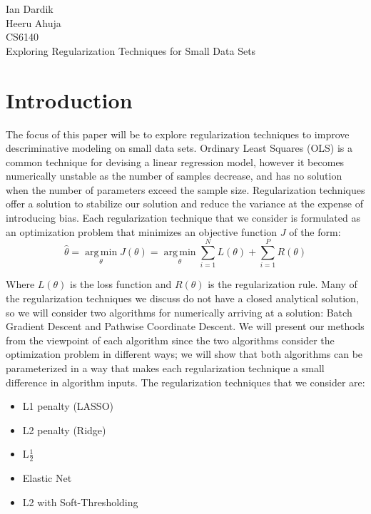 \documentclass[11pt]{article}
\newcommand{\thh}{\hat{\theta}}
\DeclareMathOperator*{\argmin}{arg\,min}
\begin{document}
Ian Dardik \\
Heeru Ahuja \\
CS6140 \\
Exploring Regularization Techniques for Small Data Sets

\section{Introduction}
The focus of this paper will be to explore regularization techniques to improve descriminative modeling on small data sets.  Ordinary Least Squares (OLS) is a common technique for devising a linear regression model, however it becomes numerically unstable as the number of samples decrease, and has no solution when the number of parameters exceed the sample size.  Regularization techniques offer a solution to stabilize our solution and reduce the variance at the expense of introducing bias.  Each regularization technique that we consider is formulated as an optimization problem that minimizes an objective function $J$ of the form:
	$$\thh = \argmin\limits_\theta J(\theta) =\argmin\limits_\theta \sum\limits_{i=1}^N L(\theta) + \sum\limits_{i=1}^P R(\theta)$$

Where $L(\theta)$ is the loss function and $R(\theta)$ is the regularization rule.  Many of the regularization techniques we discuss do not have a closed analytical solution, so we will consider two algorithms for numerically arriving at a solution: Batch Gradient Descent and Pathwise Coordinate Descent.  We will present our methods from the viewpoint of each algorithm since the two algorithms consider the optimization problem in different ways; we will show that both algorithms can be parameterized in a way that makes each regularization technique a small difference in algorithm inputs.  The regularization techniques that we consider are:
\begin{itemize}
	\item L1 penalty (LASSO)
	\item L2 penalty (Ridge)
	\item L$\frac{1}{2}$
	\item Elastic Net
	\item L2 with Soft-Thresholding
\end{itemize}
\end{document}
